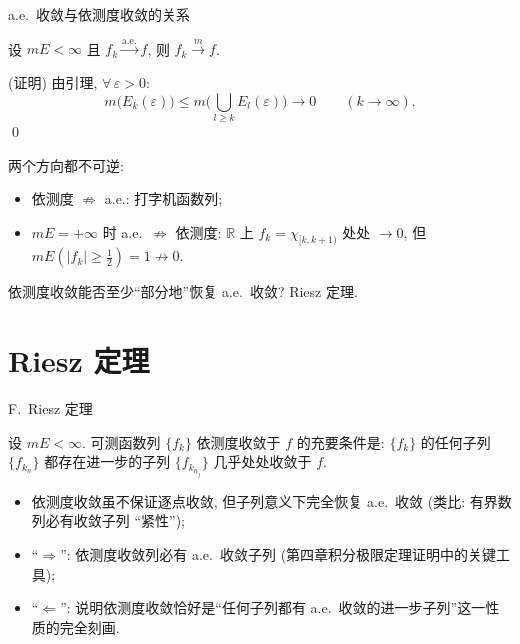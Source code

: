 
\begin{frame}{a.e.\ 收敛与依测度收敛的关系}

\begin{thm}
设 $mE < \infty$ 且 $f_k \xrightarrow{\text{a.e.}} f$, 则 $f_k \xrightarrow{m} f$.
\end{thm}

\startproof[bg=yellow, fg=red](证明)
由引理, $\forall\, \varepsilon > 0$:
\[
m\big(E_k(\varepsilon)\big) \leqslant m\Big(\bigcup_{l \geqslant k} E_l(\varepsilon)\Big) \longrightarrow 0
\qquad (k \to \infty).
\]
\qed

\pause

\begin{attnblock}
两个方向都不可逆:
\begin{itemize}
\item 依测度 $\not\Longrightarrow$ a.e.: 打字机函数列;
\item $mE = +\infty$ 时 a.e.\ $\not\Longrightarrow$ 依测度: $\mathbb{R}$ 上 $f_k = \chi_{[k, k+1)}$ 处处 $\to 0$, 但
$mE(|f_k| \geqslant \frac12) = 1 \not\to 0$.
\end{itemize}
依测度收敛能否至少``部分地''恢复 a.e.\ 收敛? \alert{Riesz 定理}.
\end{attnblock}

\end{frame}


\section{Riesz 定理}


\begin{frame}{F.~Riesz 定理}

\begin{thm}[F.~Riesz]
设 $mE < \infty$. 可测函数列 $\{f_k\}$ 依测度收敛于 $f$ 的\alert{充要条件}是: $\{f_k\}$ 的任何子列 $\{f_{k_n}\}$ 都存在进一步的子列 $\{f_{k_{n_j}}\}$ \alert{几乎处处收敛}于 $f$.
\end{thm}

\pause

\begin{itemize}
\item 依测度收敛虽不保证逐点收敛, 但\alert{子列意义下}完全恢复 a.e.\ 收敛 (类比: 有界数列必有收敛子列 ``紧性'');
\item ``$\Longrightarrow$'': 依测度收敛列必有 a.e.\ 收敛子列 (第四章积分极限定理证明中的关键工具);
\item ``$\Longleftarrow$'': 说明依测度收敛恰好是``任何子列都有 a.e.\ 收敛的进一步子列''这一性质的完全刻画.
\end{itemize}

\end{frame}

